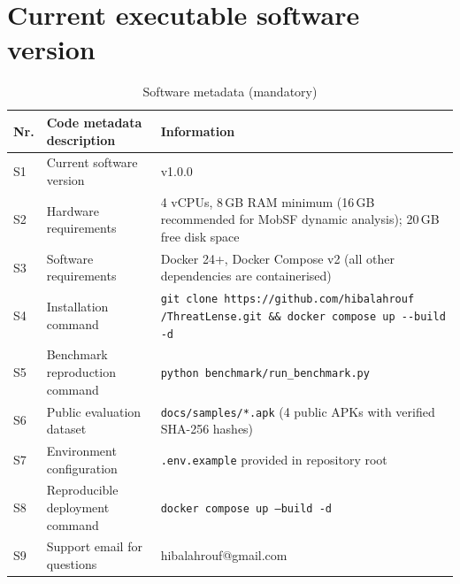 \documentclass[preprint,12pt,a4paper]{elsarticle}
\begin{document}
\section*{Current executable software version}

\begin{table}[!h]
\centering
\begin{tabular}{|l|p{5.5cm}|p{6.5cm}|}
\hline
\textbf{Nr.} & \textbf{Code metadata description} & \textbf{Information} \\
\hline
S1 & Current software version & v1.0.0 \\
\hline
S2 & Hardware requirements &
4 vCPUs, 8\,GB RAM minimum (16\,GB recommended for MobSF dynamic analysis);
20\,GB free disk space \\
\hline
S3 & Software requirements &
Docker 24+, Docker Compose v2 (all other dependencies are containerised) \\
\hline
S4 & Installation command &
\texttt{git clone https://github.com/hibalahrouf
/ThreatLense.git \&\& docker compose up -{}-build -d} \\
\hline
S5 & Benchmark reproduction command &
\texttt{python benchmark/run\_benchmark.py} \\
\hline
S6 & Public evaluation dataset &
\texttt{docs/samples/*.apk} (4 public APKs with verified SHA-256 hashes) \\
\hline
S7 & Environment configuration &
\texttt{.env.example} provided in repository root \\
\hline
S8 & Reproducible deployment command &
\texttt{docker compose up --build -d} \\
\hline
S9 & Support email for questions & hibalahrouf@gmail.com \\
\hline
\end{tabular}
\caption{Software metadata (mandatory)}
\label{tab:software_metadata}
\end{table}
\end{document}
